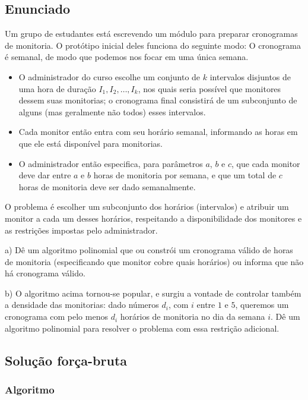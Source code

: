\documentclass[11pt]{article}
\begin{document}
\subsection{Enunciado}
\label{sec-3-1}

Um grupo de estudantes está escrevendo um módulo para preparar
cronogramas de monitoria. O protótipo inicial deles funciona do
seguinte modo: O cronograma é semanal, de modo que podemos nos focar
em uma única semana.

\begin{itemize}
\item O administrador do curso escolhe um conjunto de $k$
intervalos disjuntos de uma hora de duração $I_1, I_2, \ldots,
      I_k$, nos quais seria possível que monitores dessem suas
monitorias; o cronograma final consistirá de um subconjunto de
alguns (mas geralmente não todos) esses intervalos.
\item Cada monitor então entra com seu horário semanal, informando
as horas em que ele está disponível para monitorias.
\item O administrador então especifica, para parâmetros $a$, $b$ e
$c$, que cada monitor deve dar entre $a$ e $b$ horas de
monitoria por semana, e que um total de $c$ horas de monitoria
deve ser dado semanalmente.
\end{itemize}

O problema é escolher um subconjunto dos horários (intervalos) e
atribuir um monitor a cada um desses horários, respeitando a
disponibilidade dos monitores e as restrições impostas pelo
administrador.


a) Dê um algoritmo polinomial que ou constrói um cronograma
   válido de horas de monitoria (especificando que monitor cobre
   quais horários) ou informa que não há cronograma válido.


b) O algoritmo acima tornou-se popular, e surgiu a vontade de
   controlar também a densidade das monitorias: dado números $d_i$,
   com $i$ entre $1$ e $5$, queremos um cronograma com pelo menos
   $d_i$ horários de monitoria no dia da semana $i$. Dê um
   algoritmo polinomial para resolver o problema com essa restrição
   adicional.

\subsection{Solução força-bruta}
\label{sec-3-2}

\subsubsection{Algoritmo}
\label{sec-3-2-1}
\end{document}
